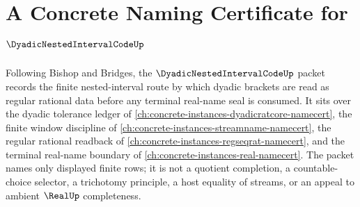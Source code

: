 \chapter{A Concrete Naming Certificate for $\DyadicNestedIntervalCodeUp$}
\label{ch:concrete-instances-dyadic-nested-interval-code-namecert}

Following Bishop and Bridges, the $\DyadicNestedIntervalCodeUp$ packet records the finite nested-interval route by which dyadic brackets are read as regular rational data before any terminal real-name seal is consumed. It sits over the dyadic tolerance ledger of \autoref{ch:concrete-instances-dyadicratcore-namecert}, the finite window discipline of \autoref{ch:concrete-instances-streamname-namecert}, the regular rational readback of \autoref{ch:concrete-instances-regseqrat-namecert}, and the terminal real-name boundary of \autoref{ch:concrete-instances-real-namecert}. The packet names only displayed finite rows; it is not a quotient completion, a countable-choice selector, a trichotomy principle, a host equality of streams, or an appeal to ambient $\RealUp$ completeness.

